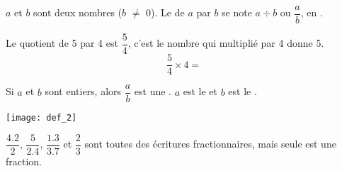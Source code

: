 \begin{mydef}
	$a$ et $b$ sont deux nombres ($b$ $\neq$ 0). Le \hspace{3cm} de $a$ par $b$ se note $a \div b$ ou $\dfrac{a}{b}$, en \hspace{5cm}.
\end{mydef}

\begin{myex}
		Le quotient de 5 par 4 est $\dfrac{5}{4}$, c'est le nombre qui multiplié par 4 donne 5. 
		\begin{equation*}
			\dfrac{5}{4} \times 4 = 
		\end{equation*}

\end{myex}

\begin{mydef}
	Si $a$ et $b$ sont entiers, alors $\dfrac{a}{b}$ est une \hspace{3cm}. $a$ est le \hspace*{3cm} et $b$ est le \hspace*{3cm}.	
	
\end{mydef}

\begin{center}
	\texttt{[image: def\_2]}
\end{center}

\begin{myex}
	$\dfrac{\num{4.2}}{\num{2}}$, $\dfrac{\num{5}}{\num{2.4}}$, $\dfrac{\num{1.3}}{\num{3.7}}$ et $\dfrac{\num{2}}{\num{3}}$ sont toutes des écritures fractionnaires, mais seule \hspace{2cm} est une fraction.
\end{myex}